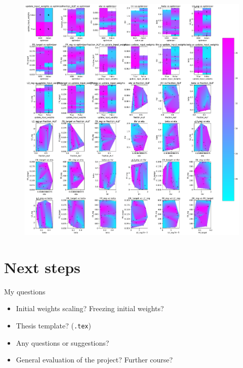 \documentclass[t]{beamer}
\begin{document}
\begin{frame}{}

	\begin{figure}[!ht]
		\includegraphics[clip, trim=0cm 0cm 0cm 0cm, width=0.6\linewidth]{all.pdf}  %
	\end{figure}

\end{frame}


\section{Next steps}
\begin{frame}{My questions}
\begin{itemize}[label=--]
\item Initial weights scaling? Freezing initial weights?
\item Thesis template? (\texttt{.tex})
\item Any questions or suggestions?
\item General evaluation of the project? Further course?
\end{itemize}


\end{frame}
\end{document}

